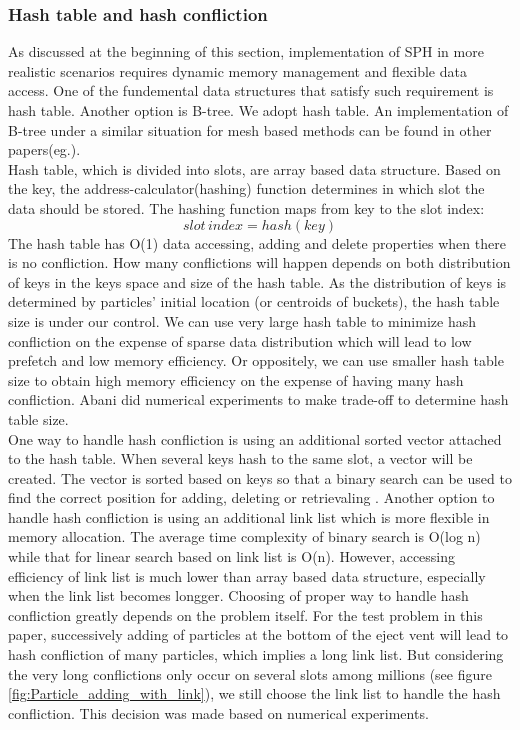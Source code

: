 \documentclass[10pt,a4paper]{article}
\begin{document}
\subsubsection{Hash table and hash confliction}
As discussed at the beginning of this section, implementation of SPH in more realistic scenarios requires dynamic memory management and flexible data access. One of the fundemental data structures that satisfy such requirement is hash table. Another option is B-tree. We adopt hash table. An implementation of B-tree under a similar situation for mesh based methods can be found in other papers(eg.\citep{patra2003data}).\\
Hash table, which is divided into slots, are array based data structure. Based on the key, the address-calculator(hashing) function determines in which slot the data should be stored. The hashing function maps from key to the slot index:
\begin{equation}
slot\,index = hash(key)
\end{equation}
The hash table has O(1) data accessing, adding and delete properties when there is no confliction. How many conflictions will happen depends on both distribution of keys in the keys space and size of the hash table. As the distribution of keys is determined by particles' initial location (or centroids of buckets), the hash table size is under our control. We can use very large hash table to minimize hash confliction on the expense of sparse data distribution which will lead to low prefetch and low memory efficiency. Or oppositely, we can use smaller hash table size to obtain high memory efficiency on the expense of having many hash confliction. Abani\citep{patra2003data} did numerical experiments to make trade-off to determine hash table size.\\
One way to handle hash confliction is using an additional sorted vector attached to the hash table. When several keys hash to the same slot, a vector will be created. The vector is sorted based on keys so that a binary search can be used to find the correct position for adding, deleting or retrievaling . Another option to handle hash confliction is using an additional link list which is more flexible in memory allocation. The average time complexity of binary search is O(log n) while that for linear search based on link list is O(n). However, accessing efficiency of link list is much lower than array based data structure, especially when the link list becomes longger. Choosing of proper way to handle hash confliction greatly depends on the problem itself. For the test problem in this paper, successively adding of particles at the bottom of the eject vent will lead to hash confliction of many particles, which implies a long link list. But considering the very long conflictions only occur on several slots among millions (see figure \ref{fig:Particle_adding_with_link}), we still choose the link list to handle the hash confliction. This decision was made based on numerical experiments.
\end{document}

